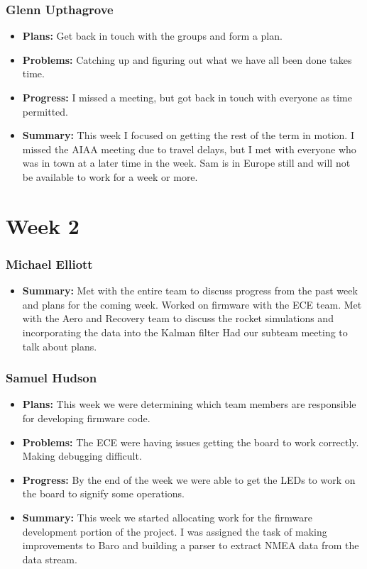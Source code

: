 \documentclass[onecolumn, draftclsnofoot,10pt, compsoc]{IEEEtran}
\begin{document}
\subsubsection{Glenn Upthagrove}
\begin {itemize}
 \item \textbf{Plans: }Get back in touch with the groups and form a plan.   
 \item \textbf{Problems: }Catching up and figuring out what we have all been done takes time.  
 \item \textbf{Progress: }I missed a meeting, but got back in touch with everyone as time permitted. 
 \item \textbf{Summary: }This week I focused on getting the rest of the term in motion. I missed the AIAA meeting due to travel delays, but I met with everyone who was in town at a later time in the week. Sam is in Europe still and will not be available to work for a week or more.  
\end {itemize}

\section{Week 2}
\subsubsection{Michael Elliott}
\begin {itemize}
 \item \textbf{Summary: }Met with the entire team to discuss progress from the past week and
plans for the coming week.
Worked on firmware with the ECE team.
Met with the Aero and Recovery team to discuss the rocket simulations
and incorporating the data into the Kalman filter
Had our subteam meeting to talk about plans.
\end{itemize}
\subsubsection{Samuel Hudson}
\begin {itemize}
 \item \textbf{Plans: }This week we were determining which team members are responsible for developing firmware code. 
 \item \textbf{Problems: }The ECE were having issues getting the board to work correctly. Making debugging difficult. 
 \item \textbf{Progress: }By the end of the week we were able to get the LEDs to work on the board to signify some operations. 
 \item \textbf{Summary: }This week we started allocating work for the firmware development portion of the project. I was assigned the task of making improvements to Baro and building a parser to extract NMEA data from the data stream.
\end {itemize}
\end{document}

